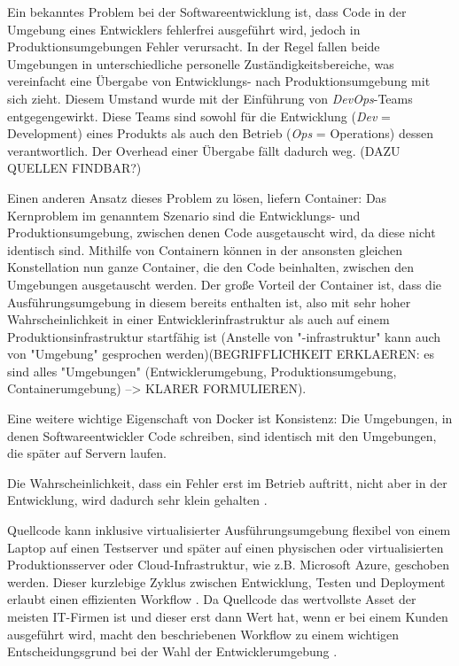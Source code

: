 \documentclass[11pt,a4paper,oneside]{report}
\begin{document}
    Ein bekanntes Problem bei der Softwareentwicklung ist, dass Code in der Umgebung eines Entwicklers fehlerfrei ausgeführt wird, jedoch in Produktionsumgebungen Fehler verursacht. In der Regel fallen beide Umgebungen in unterschiedliche personelle Zuständigkeitsbereiche, was vereinfacht eine Übergabe von Entwicklungs- nach Produktionsumgebung mit sich zieht. Diesem Umstand wurde mit der Einführung von \emph{DevOps}-Teams entgegengewirkt. Diese Teams sind sowohl für die Entwicklung (\emph{Dev} = Development) eines Produkts als auch den Betrieb (\emph{Ops} = Operations) dessen verantwortlich. Der Overhead einer Übergabe fällt dadurch weg. (DAZU QUELLEN FINDBAR?)

    Einen anderen Ansatz dieses Problem zu lösen, liefern Container: Das Kernproblem im genanntem Szenario sind die Entwicklungs- und Produktionsumgebung, zwischen denen Code ausgetauscht wird, da diese nicht identisch sind. Mithilfe von Containern können in der ansonsten gleichen Konstellation nun ganze Container, die den Code beinhalten, zwischen den Umgebungen ausgetauscht werden. Der große Vorteil der Container ist, dass die Ausführungsumgebung in diesem bereits enthalten ist, also mit sehr hoher Wahrscheinlichkeit in einer Entwicklerinfrastruktur als auch auf einem Produktionsinfrastruktur startfähig ist (Anstelle von "-infrastruktur" kann auch von "Umgebung" gesprochen werden)(BEGRIFFLICHKEIT ERKLAEREN: es sind alles "Umgebungen" (Entwicklerumgebung, Produktionsumgebung, Containerumgebung) --> KLARER FORMULIEREN).



    Eine weitere wichtige Eigenschaft von Docker ist Konsistenz: Die Umgebungen, in denen Softwareentwickler Code schreiben, sind identisch mit den Umgebungen, die später auf Servern laufen.


    Die Wahrscheinlichkeit, dass ein Fehler erst im Betrieb auftritt, nicht aber in der Entwicklung, wird dadurch sehr klein gehalten \cite[S.8]{dockerBook}.



    Quellcode kann inklusive virtualisierter Ausführungsumgebung flexibel von einem Laptop auf einen Testserver und später auf einen physischen oder virtualisierten Produktionsserver oder Cloud-Infrastruktur, wie z.B. Microsoft Azure, geschoben werden. Dieser kurzlebige Zyklus zwischen Entwicklung, Testen und Deployment erlaubt einen effizienten Workflow \cite[S.8+12]{dockerBook}.
    Da Quellcode das wertvollste Asset der meisten IT-Firmen ist und dieser erst dann Wert hat, wenn er bei einem Kunden ausgeführt wird, macht den beschriebenen Workflow zu einem wichtigen Entscheidungsgrund bei der Wahl der Entwicklerumgebung \cite[S.1]{dockerIntroIEEE}.
\end{document}
